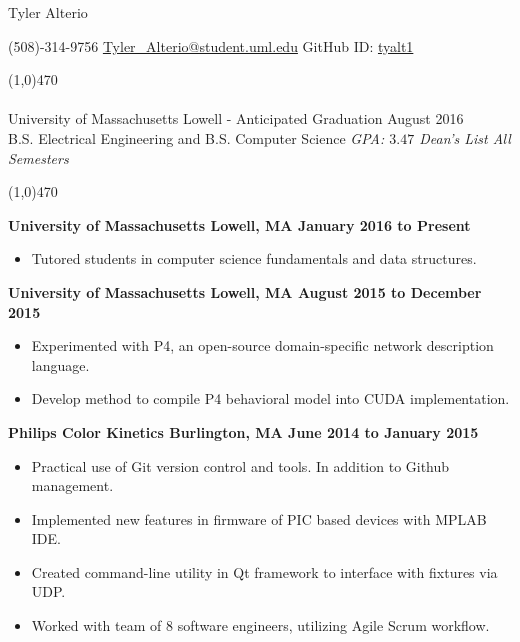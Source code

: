 \documentclass[11pt, a4paper]{article} %
\begin{document}
\centerline{\Huge \sc Tyler Alterio}

\centerline{
(508)-314-9756 \textbullet \hspace{1pt}
\href{mailto:tyler_alterio@student.uml.edu}{Tyler\_Alterio@student.uml.edu} \textbullet \hspace{1pt}
GitHub ID: \href{http://www.github.com/tyalt1}{tyalt1}
}

\noindent \line(1,0){470}\\

\smallskip \\
University of Massachusetts Lowell - Anticipated Graduation August 2016 \\
B.S. Electrical Engineering and B.S. Computer Science
\hfill {\it GPA: $3.47$ \textbullet \hspace{1pt} Dean's List All Semesters}

\noindent \line(1,0){470}\\



\centerline{\bf University of Massachusetts \textbullet \hspace{1pt} Lowell, MA \hfill January 2016 to Present}
\begin{itemize}
\itemsep0em
	\item Tutored students in computer science fundamentals and data structures.
\end{itemize}

\centerline{\bf University of Massachusetts \textbullet \hspace{1pt} Lowell, MA \hfill August 2015 to December 2015}
\begin{itemize}
\itemsep0em
	\item Experimented with P4, an open-source domain-specific network description language.
	\item Develop method to compile P4 behavioral model into CUDA implementation.
\end{itemize}

\centerline{\bf Philips Color Kinetics \textbullet \hspace{1pt} Burlington, MA \hfill June 2014 to January 2015}
\begin{itemize}
\itemsep0em
	\item Practical use of Git version control and tools. In addition to Github management.
	\item Implemented new features in firmware of PIC based devices with MPLAB IDE.
	\item Created command-line utility in Qt framework to interface with fixtures via UDP.
	\item Worked with team of 8 software engineers, utilizing Agile Scrum workflow.
\end{itemize}
\end{document}
